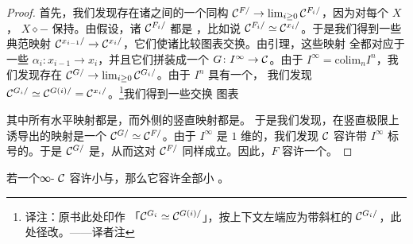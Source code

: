 \begin{proof}
首先，我们发现存在诸\trLeftFibration{}之间的一个同构
$\mathcal{C}^{F/} \to \lim_{i \ge 0} \mathcal{C}^{F_i/}$，因为对每个\trSimplicialSet{} $X$，\trFunctor{}%
$X \diamond -$ 保持\trConnected{}\trColimit{}。由假设，诸 $\mathcal{C}^{F_i/}$ 都是%
\trCorepresented{}\trLeftFibration{}，比如说 $\mathcal{C}^{F_i/} \simeq \mathcal{C}^{x_i/}$。于是我们得到一些典范映射
$\mathcal{C}^{x_{i-1}/} \to \mathcal{C}^{x_i/}$，它们使诸比较图表交换。由\trYoneda{}引理，这些映射
全都对应于一些\trMorphism{} $\alpha_i\colon x_{i-1} \to x_i$，并且它们拼装成一个%
\trFunctor{} $G\colon I^{\infty} \to \mathcal{C}$。由于
$I^{\infty} = \mathrm{colim}_n I^n$，我们发现存在
$\mathcal{C}^{G/} \to \lim_{i \ge 0} \mathcal{C}^{G_i/}$。由于 $I^n$ 具有一个\trTerminalObject{}，
我们发现 $\mathcal{C}^{G_i/} \simeq \mathcal{C}^{G(i)/} = \mathcal{C}^{x_i/}$。\footnote{译注：原书此处印作
「$\mathcal{C}^{G_i} \simeq \mathcal{C}^{G(i)/}$」，按上下文左端应为带斜杠的\trFatSlice{}%
$\mathcal{C}^{G_i/}$，此处径改。——译者注}我们得到一些交换
图表
\begin{center}
\end{center}
其中所有水平映射都是\trJoyalEquivalence{}，而外侧的竖直映射都是\trIsofibration{}。
于是我们发现，在竖直极限上诱导出的映射是一个\trJoyalEquivalence{}%
$\mathcal{C}^{G/} \simeq \mathcal{C}^{F/}$。由于 $I^{\infty}$ 是 $1$ 维的，我们发现 $\mathcal{C}$ 容许带
$I^{\infty}$ 标号的\trColimit{}。于是 $\mathcal{C}^{G/}$ 是\trCorepresented{}，从而这对 $\mathcal{C}^{F/}$
同样成立。因此，$F$ 容许一个\trColimit{}。
\end{proof}

\begin{proposition}\label{prop:small-colimits-coproducts-pushouts}
若一个∞-\trCategory{} $\mathcal{C}$ 容许小\trCoproduct{}与\trPushout{}，那么它容许全部小%
\trColimit{}。
\end{proposition}

